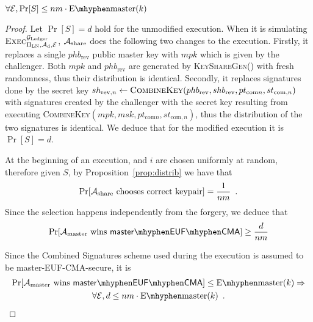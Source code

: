   \begin{proposition}
  \label{prop:forgery:master}
    $\forall \environment, \Pr[S] \leq nm \cdot \mathrm{E \mhyphen master}(k)$
  \end{proposition}

  \begin{proof}
    Let $\Pr[S] = d$ hold for the unmodified execution. When it is simulating
    $\textsc{Exec}^{\mathcal{G}_{\mathrm{Ledger}}}_{\Pi_{\mathrm{LN}}, \mathcal{A}_{\mathrm{d}},
    \mathcal{E}}$, $\mathcal{A}_{\mathrm{share}}$ does the following two changes
    to the execution. Firstly, it replaces a single $phb_{\mathrm{rev}}$ public
    master key with $mpk$ which is given by the challenger. Both $mpk$ and
    $phb_{\mathrm{rev}}$ are generated by \textsc{KeyShareGen}() with fresh
    randomness, thus their distribution is identical. Secondly, it replaces
    signatures done by the secret key $sh_{\mathrm{rev}, n} \gets
    \textsc{CombineKey}(phb_{\mathrm{rev}}, shb_{\mathrm{rev}}, pt_{\mathrm{com}
    n}, st_{\mathrm{com}, n})$ with signatures created by the challenger with
    the secret key resulting from executing \textsc{CombineKey}$(mpk, msk,
    pt_{\mathrm{com} n}, st_{\mathrm{com}, n})$, thus the distribution of the
    two signatures is identical. We deduce that for the modified execution it is
    $\Pr[S] = d$.

    At the beginning of an execution, \alice and $i$ are chosen uniformly
    at random, therefore given $S$, by Proposition~\ref{prop:distrib} we have
    that
    \begin{equation*}
      \Pr[\mathcal{A}_{\mathrm{share}} \text{ chooses correct keypair}] =
      \frac{1}{nm} \enspace.
    \end{equation*}
    Since the selection happens independently from the forgery, we deduce that
    \begin{equation*}
      \Pr[\adversary_{\mathrm{master}} \text{ wins } \mathsf{master \mhyphen EUF
      \mhyphen CMA}] \geq \frac{d}{nm}
    \end{equation*}

    Since the Combined Signatures scheme used during the execution is
    assumed to be \textsf{master-EUF-CMA}-secure, it is
    \begin{gather*}
      \Pr[\adversary_{\mathrm{master}} \text{ wins } \mathsf{master \mhyphen EUF
      \mhyphen CMA}] \leq \mathrm{E \mhyphen master}(k) \Rightarrow \\
      \forall \environment, d \leq nm \cdot \mathrm{E \mhyphen master}(k)
      \enspace.
    \end{gather*}
  \end{proof}
